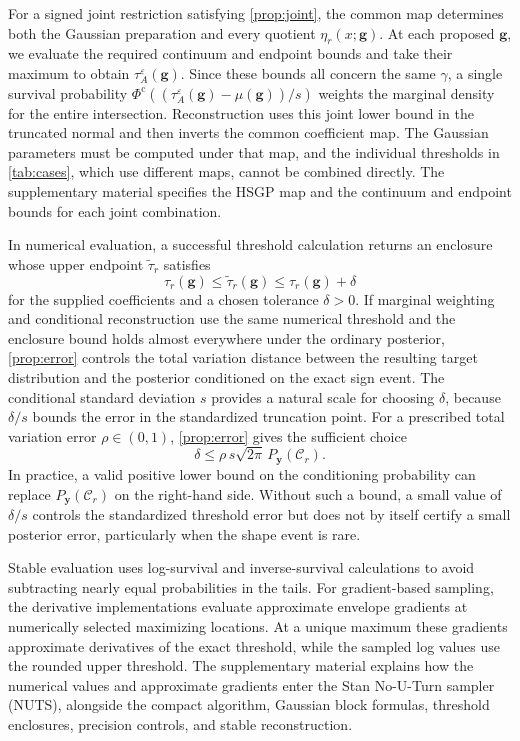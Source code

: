 For a signed joint restriction satisfying \cref{prop:joint}, the common
map determines both the Gaussian preparation and every quotient
$\eta_r(x;\boldsymbol g)$. At each proposed $\boldsymbol g$, we
evaluate the required continuum and endpoint bounds and take their
maximum to obtain $\tau_A^\varepsilon(\boldsymbol g)$. Since these
bounds all concern the same $\gamma$, a single survival probability
$\Phi^{\mathrm c}((\tau_A^\varepsilon(\boldsymbol g)-\mu(\boldsymbol g))/s)$
weights the marginal density for the entire intersection.
Reconstruction uses this joint lower bound in the truncated normal
and then inverts the common coefficient map. The Gaussian parameters
must be computed under that map, and the individual thresholds in
\cref{tab:cases}, which use different maps, cannot be combined
directly. The supplementary material specifies the HSGP map and
the continuum and endpoint bounds for each joint combination.

In numerical evaluation, a successful threshold calculation returns an
enclosure whose upper endpoint $\widetilde\tau_r$ satisfies
\[
 \tau_r(\boldsymbol g)\leq\widetilde\tau_r(\boldsymbol g)
       \leq\tau_r(\boldsymbol g)+\delta
\]
for the supplied coefficients and a chosen tolerance $\delta>0$.
If marginal weighting and conditional reconstruction use the same
numerical threshold and the enclosure bound holds almost everywhere
under the ordinary posterior, \cref{prop:error} controls the total
variation distance between the resulting target distribution and the
posterior conditioned on the exact sign event.
The conditional standard deviation $s$ provides a natural scale for
choosing $\delta$, because $\delta/s$ bounds the error in the
standardized truncation point. For a prescribed total variation
error $\rho\in(0,1)$, \cref{prop:error} gives the sufficient choice
\[
 \delta\leq\rho\,s\sqrt{2\pi}\,P_{\boldsymbol y}(\mathcal C_r).
\]
In practice, a valid positive lower bound on the conditioning
probability can replace $P_{\boldsymbol y}(\mathcal C_r)$ on the
right-hand side. Without such a bound, a small value of $\delta/s$
controls the standardized threshold error but does not by itself
certify a small posterior error, particularly when the shape event
is rare.

Stable evaluation uses log-survival and inverse-survival calculations
to avoid subtracting nearly equal probabilities in the tails. For
gradient-based sampling, the derivative implementations evaluate
approximate envelope gradients at numerically selected maximizing
locations. At a unique maximum these gradients approximate derivatives of the
exact threshold, while the sampled log values use the rounded upper
threshold. The supplementary material explains how the numerical
values and approximate gradients enter the Stan No-U-Turn sampler
(NUTS), alongside the compact algorithm, Gaussian block formulas,
threshold enclosures, precision controls, and stable reconstruction.
